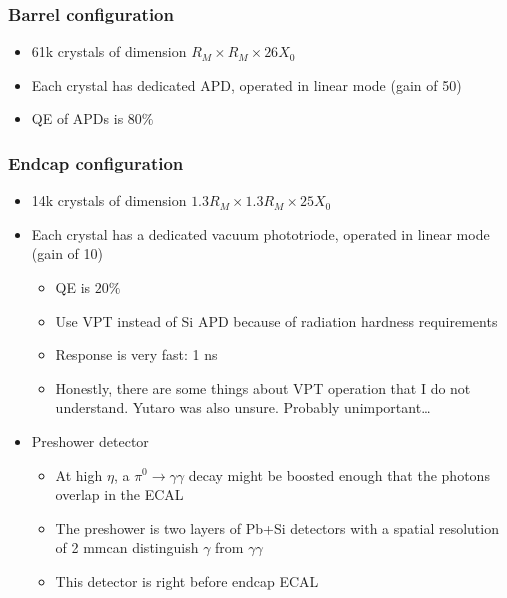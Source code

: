 \subsubsection{Barrel configuration}
\begin{itemize}
  \item 61k crystals of dimension $R_M\times R_M\times 26X_0$
  \item Each crystal has dedicated APD, operated in linear mode (gain of 50)
  \item QE of APDs is $80\%$
\end{itemize}

\subsubsection{Endcap configuration}
\begin{itemize}
  \item 14k crystals of dimension $1.3R_M\times1.3R_M\times25X_0$
  \item Each crystal has a dedicated vacuum phototriode, operated in linear mode (gain of 10)
  \begin{itemize}
    \item QE is $20\%$
    \item Use VPT instead of Si APD because of radiation hardness requirements
    \item Response is very fast: 1 ns
    \item Honestly, there are some things about VPT operation that I do not understand. Yutaro was also unsure. Probably unimportant\dots
  \end{itemize}
  \item Preshower detector
  \begin{itemize}
    \item At high $\eta$, a $\pi^0\rightarrow\gamma\gamma$ decay might be boosted enough that the photons overlap in the ECAL
    \item The preshower is two layers of Pb+Si detectors with a spatial resolution of 2 mm\thus can distinguish $\gamma$ from $\gamma\gamma$
    \item This detector is right before endcap ECAL
  \end{itemize}
\end{itemize}

